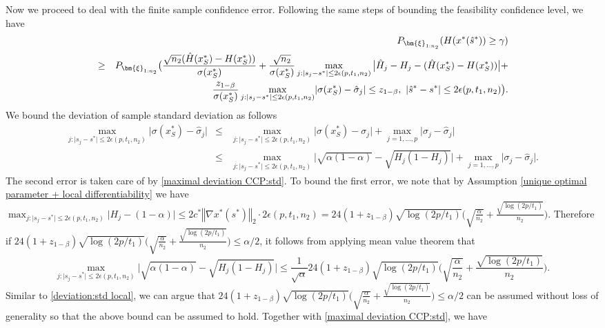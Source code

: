 \documentclass[mnsc,blindrev]{informs4} %
\newcommand{\norm}[1]{\left \Vert #1 \right\Vert}
\begin{document}
Now we proceed to deal with the finite sample confidence error. Following the same steps of bounding the feasibility confidence level, we have
\begin{eqnarray*}
&&P_{\bm{\xi}_{1:n_2}}(H(x^*(\hat s^*))\geq \gamma)\\
&\geq&P_{\bm{\xi}_{1:n_2}}\big(\frac{\sqrt{n_2}(\hat H(x^*_S)-H(x^*_S))}{\sigma(x^*_S)}+\frac{\sqrt{n_2}}{\sigma(x^*_S)}\max_{j:\lvert s_j-s^*\rvert\leq 2\epsilon(p,t_1,n_2)}\big\lvert\hat H_j-H_j-(\hat H(x^*_S)-H(x^*_S))\big\rvert+\\
&&\hspace{9ex}\frac{z_{1-\beta}}{\sigma(x^*_S)}\max_{j:\lvert s_j-s^*\rvert\leq 2\epsilon(p,t_1,n_2)}\lvert \sigma(x^*_S)-\hat \sigma_j\rvert\leq z_{1-\beta},\ \lvert \hat s^*-s^*\rvert\leq 2\epsilon(p,t_1,n_2)\big).
\end{eqnarray*}
We bound the deviation of sample standard deviation as follows
\begin{eqnarray*}
\max_{j:\lvert s_j-s^*\rvert\leq 2\epsilon(p,t_1,n_2)}\lvert \sigma(x^*_S)-\hat \sigma_j\rvert&\leq&\max_{j:\lvert s_j-s^*\rvert\leq 2\epsilon(p,t_1,n_2)}\lvert \sigma(x^*_S)-\sigma_j\rvert+\max_{j=1,\ldots,p}\lvert \sigma_j-\hat \sigma_j\rvert\\
&\leq&\max_{j:\lvert s_j-s^*\rvert\leq 2\epsilon(p,t_1,n_2)}\lvert \sqrt{\alpha(1-\alpha)}-\sqrt{H_j(1-H_j)}\rvert+\max_{j=1,\ldots,p}\lvert \sigma_j-\hat \sigma_j\rvert.
\end{eqnarray*}
The second error is taken care of by \eqref{maximal deviation CCP:std}. To bound the first error, we note that by Assumption \ref{unique optimal parameter + local differentiability} we have $\max_{j:\lvert s_j-s^*\rvert\leq 2\epsilon(p,t_1,n_2)}\lvert H_j-(1-\alpha)\rvert\leq 2c^*\norm{\nabla x^*(s^*)}_2\cdot 2\epsilon(p,t_1,n_2)=24(1+z_{1-\beta})\sqrt{\log (2p/t_1)}\big(\sqrt{\frac{\alpha}{n_2}}+\frac{\sqrt{\log (2p/t_1)}}{n_2}\big)$. Therefore if $24(1+z_{1-\beta})\sqrt{\log (2p/t_1)}\big(\sqrt{\frac{\alpha}{n_2}}+\frac{\sqrt{\log (2p/t_1)}}{n_2}\big)\leq \alpha/2$, it follows from applying mean value theorem that
\begin{equation*}
    \max_{j:\lvert s_j-s^*\rvert\leq 2\epsilon(p,t_1,n_2)}\lvert \sqrt{\alpha(1-\alpha)}-\sqrt{H_j(1-H_j)}\rvert\leq \frac{1}{\sqrt{\alpha}}24(1+z_{1-\beta})\sqrt{\log (2p/t_1)}\big(\sqrt{\frac{\alpha}{n_2}}+\frac{\sqrt{\log (2p/t_1)}}{n_2}\big).
\end{equation*}
Similar to \eqref{deviation:std local}, we can argue that $24(1+z_{1-\beta})\sqrt{\log (2p/t_1)}\big(\sqrt{\frac{\alpha}{n_2}}+\frac{\sqrt{\log (2p/t_1)}}{n_2}\big)\leq \alpha/2$ can be assumed without loss of generality so that the above bound can be assumed to hold. Together with \eqref{maximal deviation CCP:std}, we have
\end{document}
